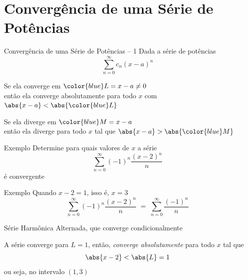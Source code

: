 \section{Convergência de uma Série de Potências}

\begin{frame}{Convergência de uma Série de Potências -- 1}
  Dada a série de potências
  \[
    \sum_{n=0}^\infty c_n(x-a)^n
  \]

  \pause
  \vspace{\baselineskip}
  Se ela converge em \({\color{blue}L}=x-a\neq 0\) \\[1mm] \pause
  então ela converge absolutamente para todo $x$ com
  \(
    \abs{x-a} < \abs{{\color{blue}L}}
  \)

  \pause
  \vspace{\baselineskip}
  Se ela diverge em \({\color{blue}M}=x-a\) \\[1mm] \pause
  então ela diverge para todo $x$ tal que
  \(
    \abs{x-a}>\abs{{\color{blue}M}}
  \)

\end{frame}

\addtocounter{exemplo}{1}
\begin{frame}{Exemplo \theexemplo}
  Determine para quais valores de $x$ a série
  \[
    \sum_{n=0}^\infty (-1)^n\frac{(x-2)^n}{n}
  \]
  é convergente
\end{frame}

\begin{frame}{Exemplo \theexemplo}
  Quando \(x-2=1\), isso é, \(x=3\)
  \pause
  \[
    \sum_{n=0}^\infty (-1)^n\frac{(x-2)^n}{n}
    \;=\;
    \sum_{n=0}^\infty \frac{(-1)^n}{n}
  \]

  \pause
  Série Harmônica Alternada, que converge condicionalmente

  \pause
  \vspace{\baselineskip}
  A série converge para
  \( L = 1 \)\pause,
  então, \emph{converge absolutamente} para todo \(x\) tal que
  \[
    \abs{x-2} < \abs{L} = 1
  \]
  \pause
  ou seja, no intervalo
  \(
    (1, 3)
  \)
\end{frame}

